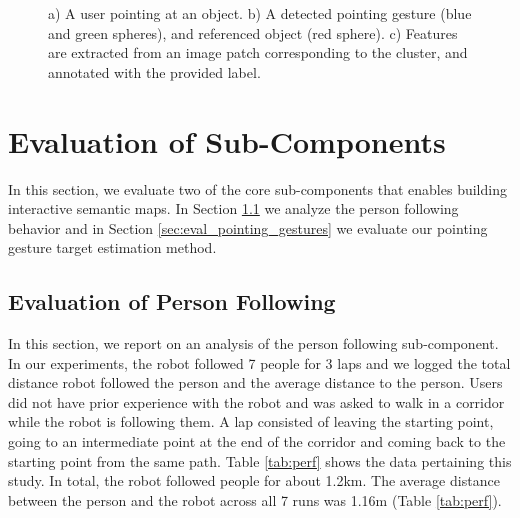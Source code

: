 \documentclass{tADR2e}
\begin{document}
\begin{figure}
\begin{center}
\begin{minipage}{160mm}
{}
\caption{a) A user pointing at an object. b) A detected pointing gesture
(blue and green spheres), and referenced object (red sphere). c) Features are
extracted from an image patch corresponding to the cluster, and annotated with the
provided label.} \label{fig:labeling_objects}
\end{minipage}
\end{center}
\end{figure}


\section{Evaluation of Sub-Components}
\label{sec:evaluation}

In this section, we evaluate two of the core sub-components that enables building interactive semantic maps. In Section \ref{sec:eval_person_following} we analyze the person following behavior and in Section \ref{sec:eval_pointing_gestures} we evaluate our pointing gesture target estimation method.

\subsection{Evaluation of Person Following}
\label{sec:eval_person_following}

In this section, we report on an analysis of the person following sub-component. In our experiments, the robot followed 7 people for 3 laps and we logged the total distance robot followed the person and the average distance to the person. Users did not have prior experience with the robot and was asked to walk in a corridor while the robot is following them. A lap consisted of leaving the starting point, going to an intermediate point at the end of the corridor and coming back to the starting point from the same path. Table \ref{tab:perf} shows the data pertaining this study. In total, the robot followed people for about 1.2km. The average distance between the person and the robot across all 7 runs was 1.16m (Table \ref{tab:perf}).
\end{document}
